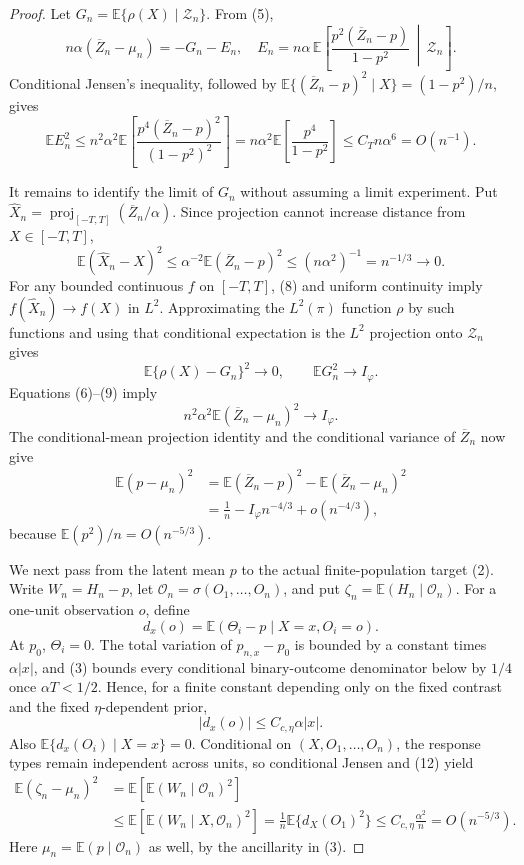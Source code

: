 \documentclass{article}
\begin{document}
{\begin{proof}
Let \(G_n=\mathbb E\{\rho(X)\mid\mathscr Z_n\}\).  From (5),
\[
n\alpha(\overline Z_n-\mu_n)=-G_n-E_n,
\quad
E_n=n\alpha\,\mathbb E\!\left[
\frac{p^2(\overline Z_n-p)}{1-p^2}
\,\middle|\,\mathscr Z_n\right].
\tag{6}
\]
Conditional Jensen's inequality, followed by
\(\mathbb E\{(\overline Z_n-p)^2\mid X\}=(1-p^2)/n\), gives
\[
\mathbb E E_n^2
\le n^2\alpha^2\mathbb E\!\left[
\frac{p^4(\overline Z_n-p)^2}{(1-p^2)^2}\right]
=n\alpha^2\mathbb E\!\left[\frac{p^4}{1-p^2}\right]
\le C_T n\alpha^6=O(n^{-1}).
\tag{7}
\]

It remains to identify the limit of \(G_n\) without assuming a limit experiment.  Put
\(\widehat X_n=\operatorname{proj}_{[-T,T]}(\overline Z_n/\alpha)\).  Since projection cannot increase distance from \(X\in[-T,T]\),
\[
\mathbb E(\widehat X_n-X)^2
\le\alpha^{-2}\mathbb E(\overline Z_n-p)^2
\le(n\alpha^2)^{-1}=n^{-1/3}\longrightarrow0.
\tag{8}
\]
For any bounded continuous \(f\) on \([-T,T]\), (8) and uniform continuity imply \(f(\widehat X_n)\to f(X)\) in \(L^2\).  Approximating the \(L^2(\pi)\) function \(\rho\) by such functions and using that conditional expectation is the \(L^2\) projection onto \(\mathscr Z_n\) gives
\[
\mathbb E\{\rho(X)-G_n\}^2\longrightarrow0,
\qquad
\mathbb EG_n^2\longrightarrow I_\varphi.
\tag{9}
\]
Equations (6)--(9) imply
\[
n^2\alpha^2\mathbb E(\overline Z_n-\mu_n)^2\longrightarrow I_\varphi.
\tag{10}
\]
The conditional-mean projection identity and the conditional variance of \(\overline Z_n\) now give
\[
\begin{aligned}
\mathbb E(p-\mu_n)^2
&=\mathbb E(\overline Z_n-p)^2
-\mathbb E(\overline Z_n-\mu_n)^2\\
&=\frac1n-I_\varphi n^{-4/3}+o(n^{-4/3}),
\end{aligned}
\tag{11}
\]
because \(\mathbb E(p^2)/n=O(n^{-5/3})\).

We next pass from the latent mean \(p\) to the actual finite-population target (2).  Write \(W_n=H_n-p\), let \(\mathscr O_n=\sigma(O_1,\ldots,O_n)\), and put
\(\zeta_n=\mathbb E(H_n\mid\mathscr O_n)\).  For a one-unit observation \(o\), define
\[
d_x(o)=\mathbb E(\Theta_i-p\mid X=x,O_i=o).
\]
At \(p_0\), \(\Theta_i=0\).  The total variation of
\(p_{n,x}-p_0\) is bounded by a constant times \(\alpha|x|\), and (3) bounds every conditional binary-outcome denominator below by \(1/4\) once \(\alpha T<1/2\).  Hence, for a finite constant depending only on the fixed contrast and the fixed \(\eta\)-dependent prior,
\[
|d_x(o)|\le C_{c,\eta}\alpha|x|.
\tag{12}
\]
Also \(\mathbb E\{d_x(O_i)\mid X=x\}=0\).  Conditional on \((X,O_1,\ldots,O_n)\), the response types remain independent across units, so conditional Jensen and (12) yield
\[
\begin{aligned}
\mathbb E(\zeta_n-\mu_n)^2
&=\mathbb E\!\left[\mathbb E(W_n\mid\mathscr O_n)^2\right]\\
&\le\mathbb E\!\left[\mathbb E(W_n\mid X,\mathscr O_n)^2\right]
=\frac1n\mathbb E\{d_X(O_1)^2\}
\le C_{c,\eta}\frac{\alpha^2}{n}=O(n^{-5/3}).
\end{aligned}
\tag{13}
\]
Here \(\mu_n=\mathbb E(p\mid\mathscr O_n)\) as well, by the ancillarity in (3).


\end{proof}}
\end{document}
